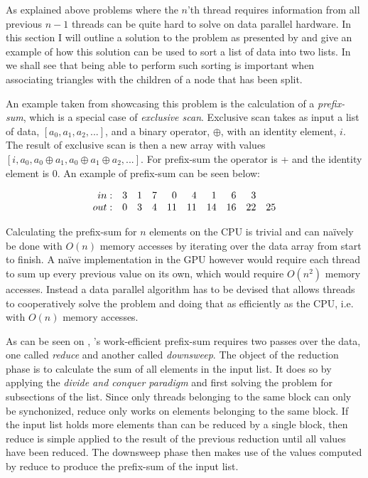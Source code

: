 
As explained above problems where the $n$’th thread requires information from
all previous $n-1$ threads can be quite hard to solve on data parallel
hardware. In this section I will outline a solution to the problem as presented
by \sengupta{} and give an example of how this solution can be used to sort a
list of data into two lists. In  we shall see that
being able to perform such sorting is important when associating triangles with
the children of a node that has been split.


An example taken from \sengupta{} showcasing this problem is the calculation of
a \textit{prefix-sum}, which is a special case of \textit{exclusive
  scan}. Exclusive scan takes as input a list of data, $[a_0, a_1, a_2, ...]$,
and a binary operator, $\oplus$, with an identity element, $i$. The result of
exclusive scan is then a new array with values $[i, a_0, a_0 \oplus a_1, a_0
  \oplus a_1 \oplus a_2, ...]$. For prefix-sum the operator is + and the
identity element is 0. An example of prefix-sum can be seen below:

\begin{displaymath}
  \begin{array}{r r r r r r r r r r}
    in: & 3 & 1 & 7 & 0 & 4 & 1 & 6 & 3 \\
    out: & 0 & 3 & 4 & 11 & 11 & 14 & 16 & 22 & 25 \\
  \end{array}
\end{displaymath}

Calculating the prefix-sum for $n$ elements on the CPU is trivial and can
naïvely be done with $O(n)$ memory accesses by iterating over the data array
from start to finish. A naïve implementation in the GPU however would require
each thread to sum up every previous value on its own, which would require
$O(n^2)$ memory accesses. Instead a data parallel algorithm has to be devised
that allows threads to cooperatively solve the problem and doing that as
efficiently as the CPU, i.e. with $O(n)$ memory accesses.



As can be seen on , \sengupta{}'s work-efficient prefix-sum
requires two passes over the data, one called \textit{reduce} and another called
\textit{downsweep}. The object of the reduction phase is to calculate the sum of
all elements in the input list. It does so by applying the \textit{divide and
  conquer paradigm} and first solving the problem for subsections of the
list. Since only threads belonging to the same block can only be synchonized,
reduce only works on elements belonging to the same block. If the input list
holds more elements than can be reduced by a single block, then reduce is simple
applied to the result of the previous reduction until all values have been
reduced. The downsweep phase then makes use of the values computed by reduce to
produce the prefix-sum of the input list.

